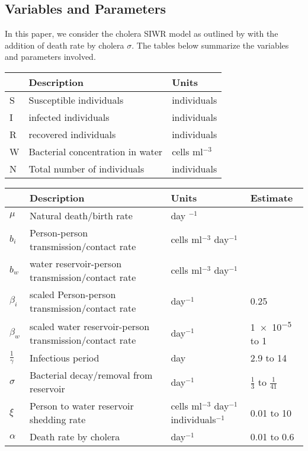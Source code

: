 \documentclass[12pt]{article}\usepackage[]{graphicx}\usepackage[]{color}
\begin{document}
\subsection{Variables and Parameters}
In this paper, we consider the cholera SIWR model as outlined by \cite{link9} with the addition of death rate by cholera $\sigma$.  The tables below summarize the variables and parameters involved.
\begin{center}
	\begin{tabular}{ | m{1em} | m{8.14cm}| m{5.5cm} | }
		\hline
		\textbf{ }& \textbf{Description} & \textbf{Units} \\
		\hline
		S & Susceptible individuals & individuals \\
		\hline
		I & infected individuals & individuals \\
		\hline
		R & recovered individuals & individuals \\
		\hline
		W & Bacterial concentration in water & cells ml$^{-3}$ \\
		\hline
		N & Total number of individuals & individuals\\
		\hline
	\end{tabular}
\end{center}
\begin{center}
	\begin{tabular}{ | m{1em} | m{8cm}| m{3cm} | m{2.2cm} | }
		\hline
		\textbf{ }& \textbf{Description} & \textbf{Units} &  \textbf{Estimate} \\
		\hline
		$\mu$ & Natural death/birth rate & day $^{-1}$ & \\
		\hline
		$b_i$ &  Person-person transmission/contact rate & cells ml$^{-3}$ day$^{-1}$ & \\
		\hline
		$b_w$ & water reservoir-person transmission/contact rate & cells ml$^{-3}$ day$^{-1}$&  \\
		\hline
		$\beta_i$ & scaled Person-person transmission/contact rate & day$^{-1}$ & 0.25\\
		\hline
		$\beta_w$ & scaled water reservoir-person transmission/contact rate & day$^{-1}$& \num{1e-5} to 1 \\
		\hline
		$\frac{1}{\gamma}$ & Infectious period & day& 2.9 to 14\\
		\hline
		$\sigma$ & Bacterial decay/removal from reservoir & day$^{-1}$& $\frac{1}{3}$ to $\frac{1}{41}$ \\
		\hline
		$\xi$ & Person to water reservoir shedding rate  & cells ml$^{-3}$ day$^{-1}$ individuals$^{-1}$ & 0.01 to 10\\
		\hline
		$\alpha$ & Death rate by cholera & day$^{-1}$& 0.01 to 0.6 \\
		\hline
	\end{tabular}
\end{center}
\end{document}
